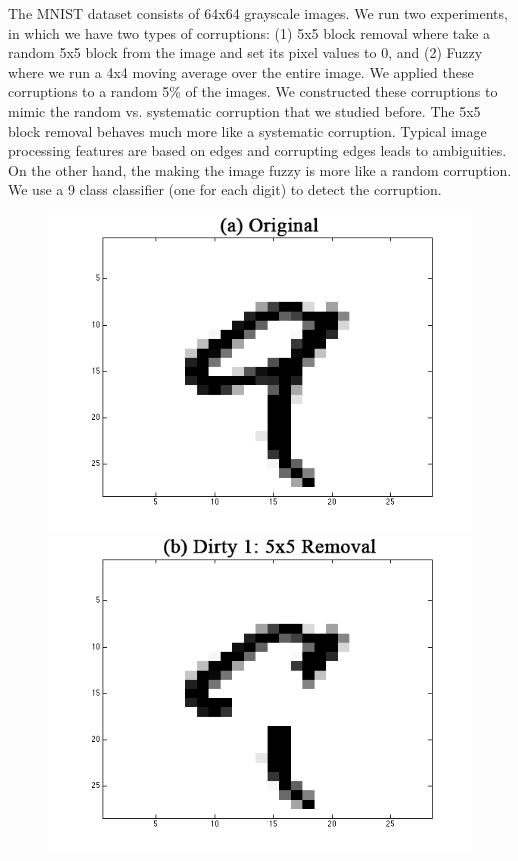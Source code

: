The MNIST dataset consists of 64x64 grayscale images.
We run two experiments, in which we have two types of corruptions: (1) 5x5 block removal where take a random 5x5 block from the image and set its pixel values to 0, and (2) Fuzzy where we run a 4x4 moving average over the entire image.
We applied these corruptions to a random 5\% of the images.
We constructed these corruptions to mimic the random vs. systematic corruption that we studied before.
The 5x5 block removal behaves much more like a systematic corruption. 
Typical image processing features are based on edges and corrupting edges leads to ambiguities.
On the other hand, the making the image fuzzy is more like a random corruption.
We use a 9 class classifier (one for each digit) to detect the corruption.


\iffalse
\begin{figure}[ht]
\centering
\includegraphics[scale=0.20]{exp/original.png}
 \includegraphics[scale=0.20]{exp/5x5removal.png}

\end{figure}

